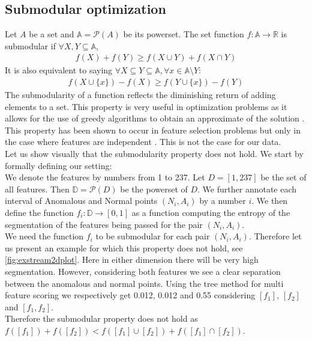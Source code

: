 \documentclass[oneside, a4paper, onecolumn, 11pt]{article}
\begin{document}
\subsection{Submodular optimization}
Let $A$ be a set and $\mathbb{A} = \mathcal{P}(A)$ be its powerset. The set function $f: \mathbb{A} \rightarrow \mathbb{R}$ is submodular if $\forall X, Y \subseteq \mathbb{A}$, 
\begin{align*}
    f(X) + f(Y) \geq f(X \cup Y) + f(X \cap Y)
\end{align*}
It is also equivalent to saying $\forall X \subseteq Y \subseteq \mathbb{A}, \forall x \in \mathbb{A} \setminus Y$: 
\begin{align*}
    f(X \cup \{x\}) - f(X) \geq f(Y \cup \{x\}) - f(Y)
\end{align*}
The submodularity of a function reflects the diminishing return of adding elements to a set. This property is very useful in optimization problems as it allows for the use of greedy algorithms to obtain an approximate of the solution \cite{niazadehsubmodular}.\\
This property has been shown to occur in feature selection problems but only in the case where features are independent \cite{submodular_independent}. This is not the case for our data.\\
Let us show visually that the submodularity property does not hold. We start by formally defining our setting:\\
We denote the features by numbers from 1 to 237. Let $D=[1, 237]$ be the set of all features. Then $\mathbb{D} = \mathcal{P} (D)$ be the powerset of $D$. We further annotate each interval of Anomalous and Normal points $(N_i, A_i)$ by a number $i$. We then define the function $f_i: \mathbb{D} \rightarrow [0, 1]$ as a function computing the entropy of the segmentation of the features being passed for the pair $(N_i, A_i)$.\\
We need the function $f_i$ to be submodular for each pair $(N_i, A_i)$. Therefore let us present an example for which this property does not hold, see \autoref{fig:exstream2dplot}. Here in either dimension there will be very high segmentation. However, considering both features we see a clear separation between the anomalous and normal points. Using the tree method for multi feature scoring we respectively get 0.012, 0.012 and 0.55 considering $[f_1]$, $[f_2]$ and $[f_1, f_2]$.\\
Therefore the submodular property does not hold as $f([f_1]) + f([f_2]) < f([f_1] \cup [f_2]) + f([f_1] \cap [f_2])$. \\
\end{document}
